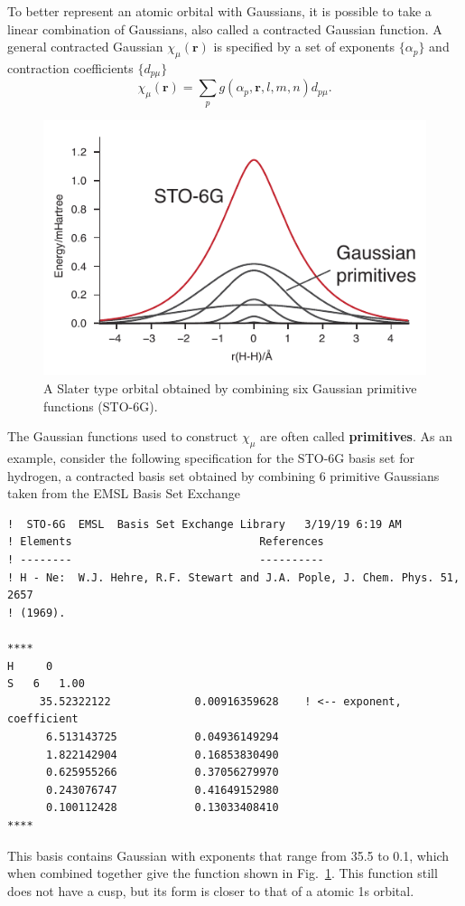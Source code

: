 \documentclass[../Main/chem532-notes.tex]{subfiles}
\begin{document}
To better represent an atomic orbital with Gaussians, it is possible to take a linear combination of Gaussians, also called a contracted Gaussian function.
A general contracted Gaussian $\chi_\mu(\mathbf{r})$ is specified by a set of exponents $\{\alpha_p \}$ and contraction coefficients $\{d_{p\mu}\}$
\begin{equation}
\chi_\mu(\mathbf{r}) = \sum_p g(\alpha_p, \mathbf{r}, l, m, n) d_{p\mu}.
\end{equation}
\begin{figure}[htbp]
   \centering
   \includegraphics{sto6g.pdf} %
   \caption{A Slater type orbital obtained by combining six Gaussian primitive functions (STO-6G).}
   \label{fig:sto6g}
\end{figure}
The Gaussian functions used to construct $\chi_\mu$ are often called \textbf{primitives}.
As an example, consider the following specification for the STO-6G basis set for hydrogen, a contracted basis set obtained by combining 6 primitive Gaussians taken from the EMSL Basis Set Exchange
\begin{verbatim}
!  STO-6G  EMSL  Basis Set Exchange Library   3/19/19 6:19 AM
! Elements                             References
! --------                             ----------
! H - Ne:  W.J. Hehre, R.F. Stewart and J.A. Pople, J. Chem. Phys. 51, 2657
! (1969).

****
H     0 
S   6   1.00
     35.52322122             0.00916359628    ! <-- exponent, coefficient
      6.513143725            0.04936149294    
      1.822142904            0.16853830490    
      0.625955266            0.37056279970    
      0.243076747            0.41649152980    
      0.100112428            0.13033408410    
****
\end{verbatim}
This basis contains Gaussian with exponents that range from 35.5 to 0.1, which when combined together give the function shown in Fig.~\ref{fig:sto6g}.
This function still does not have a cusp, but its form is closer to that of a atomic 1s orbital.

\end{document}
